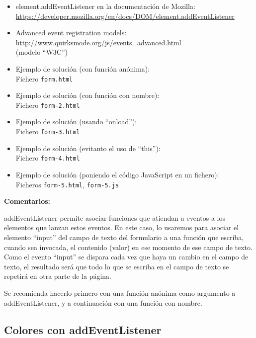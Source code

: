\begin{itemize}
\item element.addEventListener en la documentación de Mozilla: \\
  \url{https://developer.mozilla.org/en/docs/DOM/element.addEventListener}
\item Advanced event registration models: \\
  \url{http://www.quirksmode.org/js/events_advanced.html} \\
  (modelo ``W3C'')
\item Ejemplo de solución (con función anónima): \\
  Fichero \verb|form.html|
\item Ejemplo de solución (con función con nombre): \\
  Fichero \verb|form-2.html|
\item Ejemplo de solución (usando ``onload''): \\
  Fichero \verb|form-3.html|
\item Ejemplo de solución (evitanto el uso de ``this''): \\
  Fichero \verb|form-4.html|
\item Ejemplo de solución (poniendo el código JavaScript en un fichero): \\
  Ficheros \verb|form-5.html|, \verb|form-5.js|
\end{itemize}

\textbf{Comentarios:}

addEventListener permite asociar funciones que atiendan a eventos a los elementos que lanzan estos eventos. En este caso, lo usaremos para asociar el elemento ``input'' del campo de texto del formulario a una función que escriba, cuando sea invocada, el contenido (valor) en ese momento de ese campo de texto. Como el evento ``input'' se dispara cada vez que haya un cambio en el campo de texto, el resultado será que todo lo que se escriba en el campo de texto se repetirá en otra parte de la página.

Se recomienda hacerlo primero con una función anónima como argumento a addEventListener, y a continuación con una función con nombre.


\subsection{Colores con addEventListener}
\label{subsec:eje-js-addeventlistener-colores}

